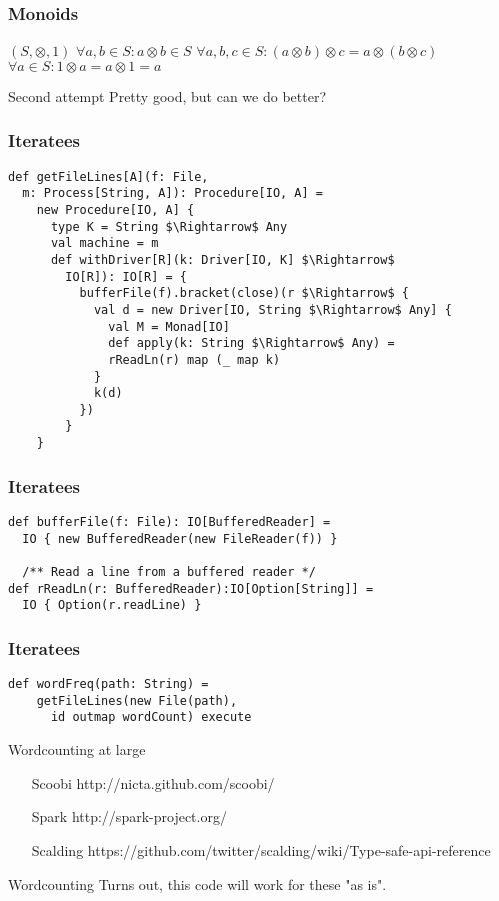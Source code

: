 \documentclass{beamer}
\begin{document}
\begin{frame}[fragile]
\frametitle{Monoids}
$(S, \otimes, 1)$\newline
$\forall a, b \in S: a \otimes b \in S$\newline
$\forall a, b, c \in S: (a \otimes b) \otimes c = a \otimes (b \otimes c)$\newline
$\forall a \in S: 1 \otimes a = a \otimes 1 = a$\newline
\end{frame}

\begin{frame}{Second attempt}
  Pretty good, but can we do better?
\end{frame}

\begin{frame}[fragile]
\frametitle{Iteratees}
\begin{lstlisting}[mathescape]
def getFileLines[A](f: File,
  m: Process[String, A]): Procedure[IO, A] =
    new Procedure[IO, A] {
      type K = String $\Rightarrow$ Any
      val machine = m
      def withDriver[R](k: Driver[IO, K] $\Rightarrow$
        IO[R]): IO[R] = {
          bufferFile(f).bracket(close)(r $\Rightarrow$ {
            val d = new Driver[IO, String $\Rightarrow$ Any] {
              val M = Monad[IO]
              def apply(k: String $\Rightarrow$ Any) =
              rReadLn(r) map (_ map k)
            }
            k(d)
          })
        }
    }
\end{lstlisting}
\end{frame}

\begin{frame}[fragile]
\frametitle{Iteratees}
\begin{lstlisting}[mathescape]
def bufferFile(f: File): IO[BufferedReader] =
  IO { new BufferedReader(new FileReader(f)) }

  /** Read a line from a buffered reader */
def rReadLn(r: BufferedReader):IO[Option[String]] =
  IO { Option(r.readLine) }
\end{lstlisting}
\end{frame}

\begin{frame}[fragile]
\frametitle{Iteratees}
\begin{lstlisting}[mathescape]
  def wordFreq(path: String) =
    getFileLines(new File(path),
      id outmap wordCount) execute
\end{lstlisting}
\end{frame}

\begin{frame}{Wordcounting at large}
\begin{enumerate}
  \item[Scoobi] http://nicta.github.com/scoobi/
  \item[Spark] http://spark-project.org/
  \item[Scalding] https://github.com/twitter/scalding/wiki/Type-safe-api-reference
\end{enumerate}
\end{frame}

\begin{frame}{Wordcounting}
  Turns out, this code will work for these "as is".
\end{frame}
\end{document}
